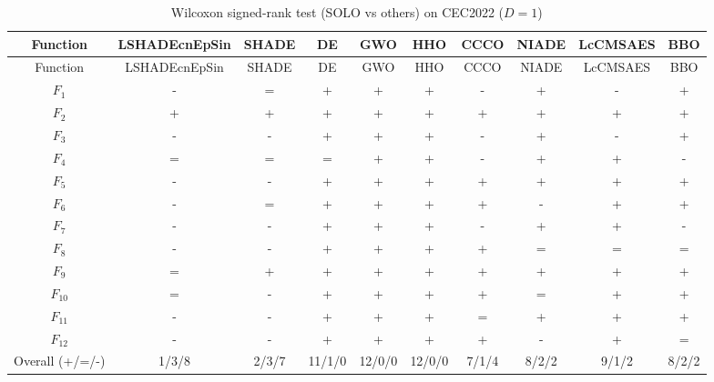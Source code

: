 \begin{center}
\small
\renewcommand{\arraystretch}{1.25}
\begin{longtable}{cccccccccc}
\caption{Wilcoxon signed-rank test (SOLO vs others) on CEC2022 ($D=1$) }
\label{tab:wilcoxon_CEC2022_1} \\
\toprule
Function & LSHADEcnEpSin & SHADE & DE & GWO & HHO & CCCO & NIADE & LcCMSAES & BBO \\
\midrule
\endfirsthead
\toprule
Function & LSHADEcnEpSin & SHADE & DE & GWO & HHO & CCCO & NIADE & LcCMSAES & BBO \\
\midrule
\endhead
$F_{1}$ & - & = & + & + & + & - & + & - & + \\
$F_{2}$ & + & + & + & + & + & + & + & + & + \\
$F_{3}$ & - & - & + & + & + & - & + & - & + \\
$F_{4}$ & = & = & = & + & + & - & + & + & - \\
$F_{5}$ & - & - & + & + & + & + & + & + & + \\
$F_{6}$ & - & = & + & + & + & + & - & + & + \\
$F_{7}$ & - & - & + & + & + & - & + & + & - \\
$F_{8}$ & - & - & + & + & + & + & = & = & = \\
$F_{9}$ & = & + & + & + & + & + & + & + & + \\
$F_{10}$ & = & - & + & + & + & + & = & + & + \\
$F_{11}$ & - & - & + & + & + & = & + & + & + \\
$F_{12}$ & - & - & + & + & + & + & - & + & = \\
\midrule
Overall (+/=/-) & 1/3/8 & 2/3/7 & 11/1/0 & 12/0/0 & 12/0/0 & 7/1/4 & 8/2/2 & 9/1/2 & 8/2/2 \\
\bottomrule
\end{longtable}
\end{center}